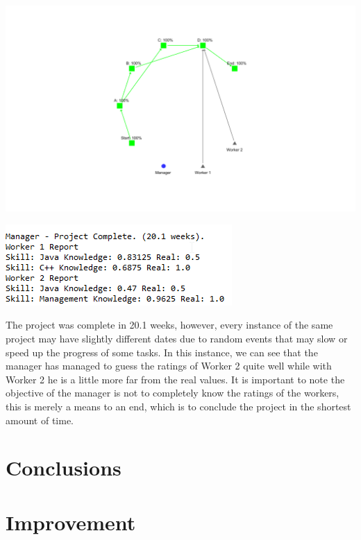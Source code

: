 \documentclass[paper=a4, fontsize=11pt]{scrartcl} %
\numberwithin{equation}{section} %
\numberwithin{figure}{section} %
\numberwithin{table}{section} %
\begin{document}
\includegraphics[scale=0.3]{exp3.png}
\begin{center}
	\includegraphics[scale=1]{data2.png}
\end{center}
The project was complete in 20.1 weeks, however, every instance of the same project may have slightly different dates due to random events that may slow or speed up the progress of some tasks. In this instance, we can see that the manager has managed to guess the ratings of Worker 2 quite well while with Worker 2 he is a little more far from the real values. It is important to note the objective of the manager is not to completely know the ratings of the workers, this is merely a means to an end, which is to conclude the project in the shortest amount of time.
\section{Conclusions}

\section{Improvement}
\end{document}
